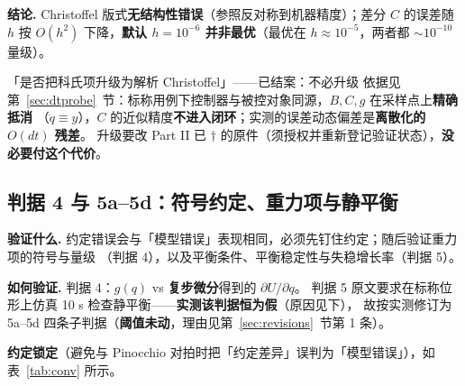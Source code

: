 \documentclass[11pt,a4paper]{ctexart}
\begin{document}
\textbf{结论.} Christoffel 版式\textbf{无结构性错误}（参照反对称到机器精度）；差分 $C$ 的误差随 $h$ 按
$O(h^2)$ 下降，\textbf{默认 $h=10^{-6}$ 并非最优}（最优在 $h\approx10^{-5}$，两者都 $\sim10^{-10}$ 量级）。

\begin{keybox}{「是否把科氏项升级为解析 Christoffel」——已结案：不必升级}
依据见第~\ref{sec:dtprobe}~节：标称用例下控制器与被控对象同源，$B,C,g$ 在采样点上\textbf{精确抵消}
（$\ddot q\equiv y$），$C$ 的近似精度\textbf{不进入闭环}；实测的误差动态偏差是\textbf{离散化的 $O(dt)$ 残差}。
升级要改 Part II 已 $\dag$ 的原件（须授权并重新登记验证状态），\textbf{没必要付这个代价}。
\end{keybox}

\subsection{判据 4 与 5a--5d：符号约定、重力项与静平衡}\label{sec:gravity}

\textbf{验证什么.} 约定错误会与「模型错误」表现相同，必须先钉住约定；随后验证重力项的符号与量级
（判据 4），以及平衡条件、平衡稳定性与失稳增长率（判据 5）。

\textbf{如何验证.} 判据 4：$g(q)$ vs \textbf{复步微分}得到的 $\partial U/\partial q$。
判据 5 原文要求在标称位形上仿真 10 s 检查静平衡——\textbf{实测该判据恒为假}（原因见下），
故按实测修订为 5a--5d 四条子判据（\textbf{阈值未动}，理由见第~\ref{sec:revisions}~节第 1 条）。

\textbf{约定锁定}（避免与 Pinocchio 对拍时把「约定差异」误判为「模型错误」），如表~\ref{tab:conv} 所示。

\begin{table}[H]
\centering
\small
\caption{符号约定锁定与实测核对}\label{tab:conv}
\end{table}
\end{document}
